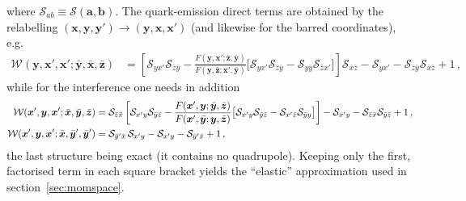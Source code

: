 \documentclass[11pt,a4paper]{article}
\newcommand{\calW}{\mathcal{W}}
\newcommand{\calS}{\mathcal{S}}
\newcommand{\vx}{\bm{x}}
\newcommand{\vy}{\bm{y}}
\newcommand{\vxb}{\bar{\bm{x}}}
\newcommand{\vyb}{\bar{\bm{y}}}
\newcommand{\vzb}{\bar{\bm{z}}}
\numberwithin{equation}{section}
\begin{document}
where $\calS_{ab}\equiv\calS(\bm a,\bm b)$. The quark-emission direct terms are obtained by
the relabelling $(\vx,\vy,\vy')\to(\vy,\vx,\vx')$ (and likewise for the barred coordinates),
e.g.
\begin{align}
\calW(\vy,\vx',\vx';\vyb,\vxb,\vzb) & =
\left[\calS_{yx'}\calS_{\bar z\bar y} - \frac{F(\vy,\vx';\vzb,\vyb)}{F(\vy,\vzb;\vx',\vyb)}
\big[\calS_{yx'}\calS_{\bar z\bar y}-\calS_{y\bar y}\calS_{\bar zx'}\big]\right]
\calS_{\bar x\bar z} - \calS_{yx'} - \calS_{\bar z\bar y}\calS_{\bar x\bar z} +1\,,
\end{align}
while for the interference one needs in addition
\begin{align}
\calW(\vx',\vy,\vx';\vxb,\vyb,\vzb) & = \calS_{\bar z\bar x}
\left[\calS_{x'y}\calS_{\bar y\bar z} - \frac{F(\vx',\vy;\vyb,\vzb)}{F(\vx',\vyb;\vy,\vzb)}
\big[\calS_{x'y}\calS_{\bar y\bar z}-\calS_{x'\bar z}\calS_{\bar yy}\big]\right]
- \calS_{x'y} - \calS_{\bar z\bar x}\calS_{\bar y\bar z} + 1\,,\notag\\
\calW(\vx',\vy,\vx';\vxb,\vyb',\vyb') & = \calS_{\bar y'\bar x}\,\calS_{x'y}
- \calS_{x'y} - \calS_{\bar y'\bar x} +1\,,
\end{align}
the last structure being exact (it contains no quadrupole). Keeping only the first,
factorised term in each square bracket yields the ``elastic'' approximation used in
section~\ref{sec:momspace}.
\end{document}
